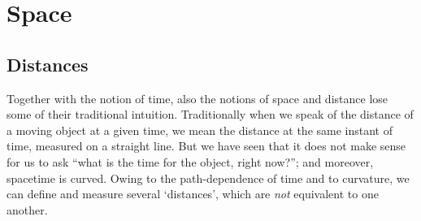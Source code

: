 \section{Space}
\label{sec:space}

\subsection{Distances}
\label{sec:distances}

Together with the notion of time, also the notions of space and distance lose some of their traditional intuition. Traditionally when we speak of the distance of a moving object at a given time, we mean the distance at the same instant of time, measured on a straight line. But we have seen that it does not make sense for us to ask \enquote{what is the time for the object, right now?}; and moreover, spacetime is curved. Owing to the path-dependence of time and to curvature, we can define and measure several \enquote*{distances}, which are \emph{not} equivalent to one another.

\medskip

